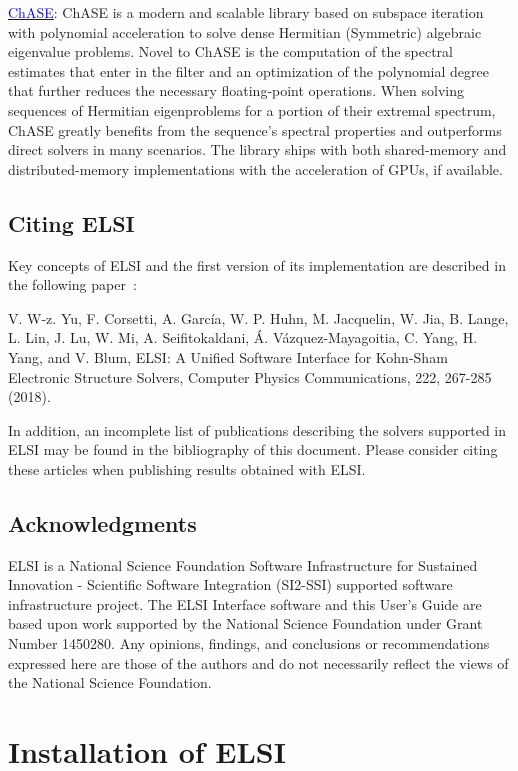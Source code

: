 \documentclass{report}
\newcommand{\tcb}[1]{\textcolor{blue}{#1}}
\begin{document}
\href{https://chase-library.github.io/ChASE/}{\tcb{ChASE}}: ChASE is a modern and scalable library based on subspace iteration with polynomial acceleration to solve dense Hermitian (Symmetric) algebraic eigenvalue problems. Novel to ChASE is the computation of the spectral estimates that enter in the filter and an optimization of the polynomial degree that further reduces the necessary floating-point operations. When solving sequences of Hermitian eigenproblems for a portion of their extremal spectrum, ChASE greatly benefits from the sequence’s spectral properties and outperforms direct solvers in many scenarios. The library ships with both shared-memory and distributed-memory implementations with the acceleration of GPUs, if available.

\section{Citing ELSI}
\label{sec:cite}
Key concepts of ELSI and the first version of its implementation are described in the following paper~\cite{elsi_yu_2018}:

V. W-z. Yu, F. Corsetti, A. Garc\'{i}a, W. P. Huhn, M. Jacquelin, W. Jia, B. Lange, L. Lin, J. Lu, W. Mi, A. Seifitokaldani, \'{A}. V\'{a}zquez-Mayagoitia, C. Yang, H. Yang, and V. Blum, ELSI: A Unified Software Interface for Kohn-Sham Electronic Structure Solvers, Computer Physics Communications, 222, 267-285 (2018).

In addition, an incomplete list of publications describing the solvers supported in ELSI may be found in the bibliography of this document. Please consider citing these articles when publishing results obtained with ELSI.

\section{Acknowledgments}
\label{sec:thanks}
ELSI is a National Science Foundation Software Infrastructure for Sustained Innovation - Scientific Software Integration (SI2-SSI) supported software infrastructure project. The ELSI Interface software and this User's Guide are based upon work supported by the National Science Foundation under Grant Number 1450280. Any opinions, findings, and conclusions or recommendations expressed here are those of the authors and do not necessarily reflect the views of the National Science Foundation.

\chapter{Installation of ELSI}
\end{document}

